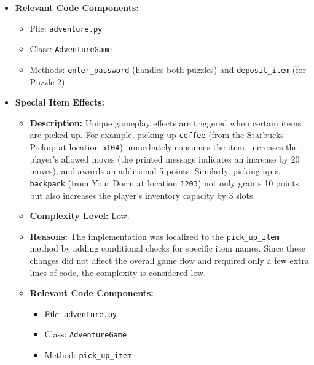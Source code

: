 \documentclass[11pt]{article}
\begin{document}
\begin{enumerate}
\begin{itemize}
\begin{itemize}
        \end{itemize}
        \item \textbf{Relevant Code Components:}  
        \begin{itemize}
            \item File: \texttt{adventure.py}
            \item Class: \texttt{AdventureGame}
            \item Methods: \texttt{enter\_password} (handles both puzzles) and \texttt{deposit\_item} (for Puzzle 2)
        \end{itemize}
    \end{itemize}


    \begin{itemize}
    \item \textbf{Special Item Effects:}
    \begin{itemize}
        \item \textbf{Description:}  
        Unique gameplay effects are triggered when certain items are picked up. For example, picking up \texttt{coffee} (from the Starbucks Pickup at location \texttt{5104}) immediately consumes the item, increases the player’s allowed moves (the printed message indicates an increase by 20 moves), and awards an additional 5 points. Similarly, picking up a \texttt{backpack} (from Your Dorm at location \texttt{1203}) not only grants 10 points but also increases the player's inventory capacity by 3 slots.
        \item \textbf{Complexity Level:} Low.
        \item \textbf{Reasons:}  
        The implementation was localized to the \texttt{pick\_up\_item} method by adding conditional checks for specific item names. Since these changes did not affect the overall game flow and required only a few extra lines of code, the complexity is considered low.
        \item \textbf{Relevant Code Components:}  
        \begin{itemize}
            \item File: \texttt{adventure.py}
            \item Class: \texttt{AdventureGame}
            \item Method: \texttt{pick\_up\_item}
        \end{itemize}
    \end{itemize}


\end{itemize}
\end{enumerate}
\end{document}
